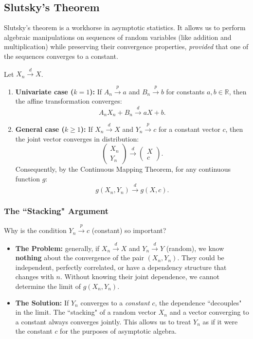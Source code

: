 \subsection*{Slutsky's Theorem}

Slutsky's theorem is a workhorse in asymptotic statistics. It allows us to perform algebraic manipulations on sequences of random variables (like addition and multiplication) while preserving their convergence properties, \textit{provided} that one of the sequences converges to a constant.

\begin{theo}
    \label{thm:slutsky}
Let $X_n \xrightarrow{d} X$.
\begin{enumerate}[label=\alph*)]
    \item \textbf{Univariate case ($k=1$):} If $A_n \xrightarrow{p} a$ and $B_n \xrightarrow{p} b$ for constants $a, b \in \mathbb{R}$, then the affine transformation converges:
    \[ A_n X_n + B_n \xrightarrow{d} aX + b. \]
    \item \textbf{General case ($k \ge 1$):} If $X_n \xrightarrow{d} X$ and $Y_n \xrightarrow{p} c$ for a constant vector $c$, then the joint vector converges in distribution:
    \[ \begin{pmatrix} X_n \\ Y_n \end{pmatrix} \xrightarrow{d} \begin{pmatrix} X \\ c \end{pmatrix}. \]
    Consequently, by the Continuous Mapping Theorem, for any continuous function $g$:
    \[ g(X_n, Y_n) \xrightarrow{d} g(X, c). \]
\end{enumerate}
\end{theo}

\subsubsection*{The ``Stacking" Argument}
Why is the condition $Y_n \xrightarrow{p} c$ (constant) so important?
\begin{itemize}
    \item \textbf{The Problem:} generally, if $X_n \xrightarrow{d} X$ and $Y_n \xrightarrow{d} Y$ (random), we know \textbf{nothing} about the convergence of the pair $(X_n, Y_n)$. They could be independent, perfectly correlated, or have a dependency structure that changes with $n$. Without knowing their joint dependence, we cannot determine the limit of $g(X_n, Y_n)$.
    \item \textbf{The Solution:} If $Y_n$ converges to a \textit{constant} $c$, the dependence ``decouples" in the limit. The ``stacking" of a random vector $X_n$ and a vector converging to a constant always converges jointly. This allows us to treat $Y_n$ as if it were the constant $c$ for the purposes of asymptotic algebra.
\end{itemize}

